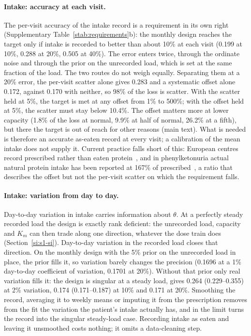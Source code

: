 \paragraph{Intake: accuracy at each visit.} The per-visit accuracy of the intake record is a
requirement in its own right (Supplementary Table~\ref{stab:requirements}b): the monthly design
reaches the target only if intake is recorded to better than about 10\% at each visit (0.199 at
10\%, 0.288 at 20\%, 0.505 at 40\%). The error enters twice, through the ordinate noise and
through the prior on the unrecorded load, which is set at the same fraction of the load. The two
routes do not weigh equally. Separating them at a 20\% error, the per-visit scatter alone gives
0.283 and a systematic offset alone 0.172, against 0.170 with neither, so 98\% of the loss is
scatter. With the scatter held at 5\%, the target is met at any offset from 1\% to 500\%; with the
offset held at 5\%, the scatter must stay below 10.4\%. The offset matters more at lower capacity
(1.8\% of the loss at normal, 9.9\% at half of normal, 26.2\% at a fifth), but there the target is
out of reach for other reasons (main text). What is needed is therefore an accurate as-eaten
record at every visit; a calibration of the mean intake does not supply it. Current practice
falls short of this:
European centres record prescribed rather than eaten protein~\cite{pa_diet_survey}, and in
phenylketonuria actual natural protein intake has been reported at 167\% of
prescribed~\cite{pku_prescribed_actual}, a ratio that describes the offset but not the per-visit
scatter on which the requirement falls.

\paragraph{Intake: variation from day to day.} Day-to-day variation in intake carries
information about $\theta$. At a perfectly steady recorded load the design is exactly rank
deficient: the unrecorded load, capacity and $K_m$ can then trade along one direction, whatever
the dose train does (Section~\ref{si:s1-si}). Day-to-day variation in the recorded load closes that
direction. On the monthly design with the 5\% prior on the unrecorded load in place, the prior
fills it, so variation barely changes the precision (0.1696 at a 1\% day-to-day coefficient of
variation, 0.1701 at 20\%). Without that prior only real variation fills it: the design is
singular at a steady load, gives 0.264 (0.229--0.355) at 2\% variation, 0.174 (0.171--0.187) at
10\% and 0.171 at 20\%. Smoothing the record, averaging it to weekly means or imputing it from the
prescription removes from the fit the variation the patient's intake actually has, and in the
limit turns the record into the singular steady-load case. Recording intake as eaten and leaving
it unsmoothed costs nothing; it omits a data-cleaning step.

